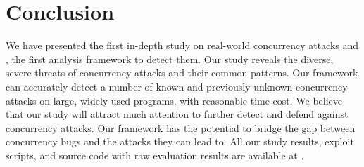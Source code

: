 \section{Conclusion}\label{sec:conclusion}


We have presented the first in-depth study on real-world concurrency attacks 
and \xxx, the first analysis framework to detect them. Our study reveals the 
diverse, severe threats of concurrency attacks and their common patterns. Our 
\xxx framework can accurately detect a number of known and previously unknown 
concurrency attacks on large, widely used programs, with reasonable time cost. 
We believe that our study will attract much attention to further detect 
and defend against concurrency attacks. Our \xxx framework has the potential to 
bridge the gap between concurrency bugs and the attacks they can lead to. All 
our study results, exploit scripts, and \xxx source code with raw evaluation 
results are available at \github.

